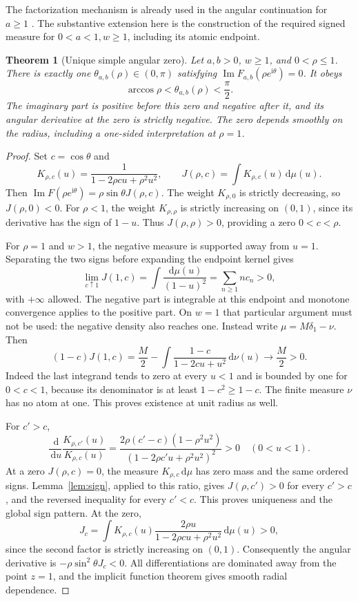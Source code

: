 \documentclass[11pt]{article}
\numberwithin{equation}{section}
\newtheorem{theorem}{Theorem}[section]
\theoremstyle{definition}\newtheorem{definition}[theorem]{Definition}
\theoremstyle{remark}\newtheorem{remark}[theorem]{Remark}
\newcommand{\dd}{\,\mathrm d}
\newcommand{\ii}{\mathrm i}
\DeclareMathOperator{\Impart}{Im}
\begin{document}
The factorization mechanism is already used in the angular continuation
for $a\ge1$ \cite{angular}. The substantive extension here is the
construction of the required signed measure for $0<a<1,w\ge1$,
including its atomic endpoint.

\begin{theorem}[Unique simple angular zero]\label{thm:angular}
Let $a,b>0$, $w\ge1$, and $0<\rho\le1$. There is exactly one
$\theta_{a,b}(\rho)\in(0,\pi)$ satisfying
$\Impart F_{a,b}(\rho e^{\ii\theta})=0$. It obeys
\begin{equation}\label{eq:anglerange}
 \arccos\rho<\theta_{a,b}(\rho)<\frac\pi2.
\end{equation}
The imaginary part is positive before this zero and negative after
it, and its angular derivative at the zero is strictly negative.
The zero depends smoothly on the radius, including a one-sided
interpretation at $\rho=1$.
\end{theorem}
\begin{proof}
Set $c=\cos\theta$ and
\[
 K_{\rho,c}(u)=\frac1{1-2\rho cu+\rho^2u^2},\qquad
 J(\rho,c)=\int K_{\rho,c}(u)\dd\mu(u).
\]
Then $\Impart F(\rho e^{\ii\theta})=\rho\sin\theta J(\rho,c)$.
The weight $K_{\rho,0}$ is strictly decreasing, so $J(\rho,0)<0$.
For $\rho<1$, the weight $K_{\rho,\rho}$ is strictly increasing on
$(0,1)$, since its derivative has the sign of $1-u$. Thus
$J(\rho,\rho)>0$, providing a zero $0<c<\rho$.

For $\rho=1$ and $w>1$, the negative measure is supported away from
$u=1$. Separating the two signs before expanding the endpoint kernel
gives
\[
 \lim_{c\uparrow1}J(1,c)=\int\frac{\dd\mu(u)}{(1-u)^2}
 =\sum_{n\ge1}n c_n>0,
\]
with $+\infty$ allowed. The negative part is integrable at this
endpoint and monotone convergence applies to the positive part.
On $w=1$ that particular argument must not be used: the negative
density also reaches one. Instead write $\mu=M\delta_1-\nu$.
Then
\[
 (1-c)J(1,c)=\frac M2
 -\int\frac{1-c}{1-2cu+u^2}\dd\nu(u)\longrightarrow\frac M2>0.
\]
Indeed the last integrand tends to zero at every $u<1$ and is
bounded by one for $0<c<1$, because its denominator is at least
$1-c^2\ge1-c$. The finite measure $\nu$ has no atom at one.
This proves existence at unit radius as well.

For $c'>c$,
\begin{equation}\label{eq:kernelratio}
 \frac{\dd}{\dd u}\frac{K_{\rho,c'}(u)}{K_{\rho,c}(u)}
 =\frac{2\rho(c'-c)(1-\rho^2u^2)}
 {(1-2\rho c'u+\rho^2u^2)^2}>0\quad(0<u<1).
\end{equation}
At a zero $J(\rho,c)=0$, the measure $K_{\rho,c}\dd\mu$ has zero
mass and the same ordered signs. Lemma~\ref{lem:sign}, applied to
this ratio, gives $J(\rho,c')>0$ for every $c'>c$, and the reversed
inequality for every $c'<c$. This proves uniqueness and the global
sign pattern. At the zero,
\[
 J_c=\int K_{\rho,c}(u)\frac{2\rho u}{1-2\rho cu+\rho^2u^2}
       \dd\mu(u)>0,
\]
since the second factor is strictly increasing on $(0,1)$.
Consequently the angular derivative is
$-\rho\sin^2\theta J_c<0$. All differentiations are dominated away
from the point $z=1$, and the implicit function theorem gives smooth
radial dependence.
\end{proof}
\end{document}
